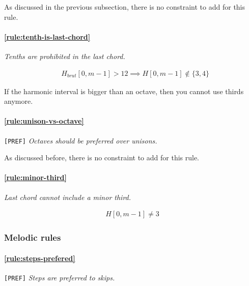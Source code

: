     As discussed in the previous subsection, there is no constraint to add for this rule.
    
    \paragraph{\hspace{.6cm}\ref{rule:tenth-is-last-chord}}  \textit{Tenths are prohibited in the last chord.}

    \begin{equation} \begin{aligned}
    &H_{brut}[0, m-1] > 12 \implies H[0, m-1] \notin \{3, 4\}
    \end{aligned} \end{equation}

    If the harmonic interval is bigger than an octave, then you cannot use thirds anymore.

    \paragraph{\hspace{.6cm}\ref{rule:unison-vs-octave}} \texttt{[PREF]} \textit{Octaves should be preferred over unisons.}

    As discussed before, there is no constraint to add for this rule.

    \paragraph{\hspace{.6cm}\ref{rule:minor-third}}  \textit{Last chord cannot include a minor third.}

    \begin{equation} \begin{aligned}
    H[0, m-1] \neq 3
    \end{aligned} \end{equation}

\subsubsection{Melodic rules}
\paragraph{\hspace{.6cm}\ref{rule:steps-prefered}} \texttt{[PREF]} \textit{Steps are preferred to skips.}

